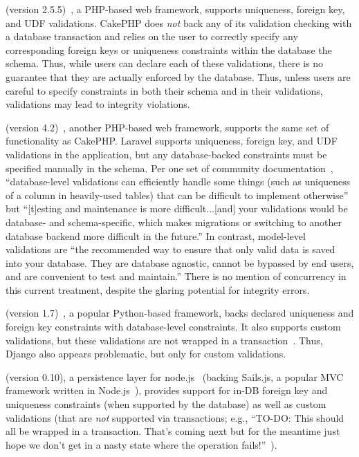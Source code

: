  (version 2.5.5)~\cite{code-cakephp}, a PHP-based web
framework, supports uniqueness, foreign key, and UDF
validations. CakePHP does \textit{not} back any of its validation
checking with a database transaction and relies on the user to
correctly specify any corresponding foreign keys or uniqueness
constraints within the database the schema. Thus, while users can
declare each of these validations, there is no guarantee that they are
actually enforced by the database. Thus, unless users are careful to
specify constraints in both their schema and in their validations,
validations may lead to integrity violations.

 (version 4.2)~\cite{code-laravel}, another PHP-based web
framework, supports the same set of functionality as CakePHP. Laravel
supports uniqueness, foreign key, and UDF validations in the
application, but any database-backed constraints must be specified
manually in the schema. Per one set of community documentation~\cite{laravel-book}, ``database-level
validations can efficiently handle some things (such as uniqueness of
a column in heavily-used tables) that can be difficult to implement
otherwise'' but ``[t]esting and maintenance is more difficult...[and]
your validations would be database- and schema-specific, which makes
migrations or switching to another database backend more difficult in
the future.'' In contrast, model-level validations are ``the
recommended way to ensure that only valid data is saved into your
database. They are database agnostic, cannot be bypassed by end users,
and are convenient to test and maintain.'' There
is no mention of concurrency in this current treatment, despite the
glaring potential for integrity errors.

 (version 1.7)~\cite{code-django}, a popular Python-based
framework, backs declared uniqueness and foreign key constraints with
database-level constraints. It also supports custom validations, but
these validations are not wrapped in a
transaction~\cite{code-django-constraints}. Thus, Django also appears
problematic, but only for custom validations.

 (version 0.10), a persistence layer for
node.js~\cite{code-waterline} (backing Sails.js, a popular MVC
framework written in Node.js~\cite{code-sails}), provides support for
in-DB foreign key and uniqueness constraints (when supported by the
database) as well as custom validations (that are \textit{not}
supported via transactions; e.g., ``TO-DO: This should all be wrapped
in a transaction. That's coming next but for the meantime just hope we
don't get in a nasty state where the operation
fails!''~\cite{code-waterline-txn}).

